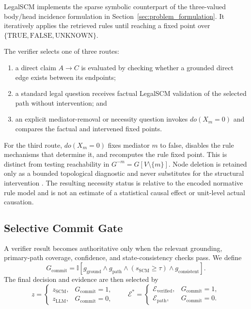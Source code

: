 LegalSCM implements the sparse symbolic counterpart of the three-valued
body/head incidence formulation in Section~\ref{sec:problem_formulation}. It
iteratively applies the retrieved rules until reaching a fixed point over
$\{\mathrm{TRUE},\mathrm{FALSE},\mathrm{UNKNOWN}\}$.

The verifier selects one of three routes:

\begin{enumerate}
    \item a direct claim $A\rightarrow C$ is evaluated by checking whether a
    grounded direct edge exists between its endpoints;
    \item a standard legal question receives factual LegalSCM validation of
    the selected path without intervention; and
    \item an explicit mediator-removal or necessity question invokes
    $do(X_m=0)$ and compares the factual and intervened fixed points.
\end{enumerate}

For the third route, $do(X_m=0)$ fixes mediator $m$ to false, disables the rule
mechanisms that determine it, and recomputes the rule fixed point. This is
distinct from testing reachability in
$G^{-m}=G[V\setminus\{m\}]$. Node deletion is retained only as a bounded
topological diagnostic and never substitutes for the structural intervention
\cite{pearl2009causality}. The resulting necessity status is relative to the
encoded normative rule model and is not an estimate of a statistical causal
effect or unit-level actual causation.

\subsection{Selective Commit Gate}

A verifier result becomes authoritative only when the relevant grounding,
primary-path coverage, confidence, and state-consistency checks pass. We define
\begin{equation}
G_{\mathrm{commit}}
=
\mathbb{I}
[
g_{\mathrm{ground}}
\land g_{\mathrm{path}}
\land (s_{\mathrm{SCM}}\geq\tau)
\land g_{\mathrm{consistent}}
].
\end{equation}
The final decision and evidence are then selected by
\begin{equation}
z=
\begin{cases}
z_{\mathrm{SCM}}, & G_{\mathrm{commit}}=1,\\
z_{\mathrm{LLM}}, & G_{\mathrm{commit}}=0,
\end{cases}
\qquad
\mathcal{E}^*=
\begin{cases}
\mathcal{E}_{\mathrm{verified}}, & G_{\mathrm{commit}}=1,\\
\mathcal{E}_{\mathrm{path}}, & G_{\mathrm{commit}}=0.
\end{cases}
\label{eq:selective_commit}
\end{equation}

